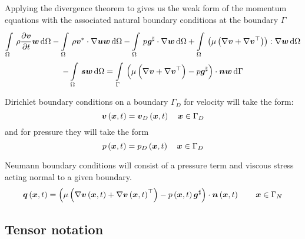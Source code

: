 Applying the divergence theorem to 
gives us the weak form of the momentum equations with the associated natural
boundary conditions at the boundary $\Gamma$ \ie
\begin{multline}
  \gint{\Omega}{}{\rho\delby{\vectr{v}}{t}{\vectr{w}}}{\Omega}
  -\gint{\Omega}{}{\dotprod{\rho\vectr{v}^{*}}{\gradient{}{\vectr{u}}}\vectr{w}}{\Omega}
  -\gint{\Omega}{}{\dotprod{p\sharptensor{\tensor{g}}}{\gradient{}{\vectr{w}}}}{\Omega}
  +\gint{\Omega}{}{\doubledotprod{\pbrac{\mu\pbrac{\gradient{}{\vectr{v}}
          +\gradient{}{\transpose{\vectr{v}}}}}}{\gradient{}{\vectr{w}}}}{\Omega} \\
  -\gint{\Omega}{}{\vectr{s}\vectr{w}}{\Omega}
  =\gint{\Gamma}{}{\dotprod{\pbrac{\mu\pbrac{\gradient{}{\vectr{v}}+\transpose{\gradient{}{\vectr{v}}}}-
        p\sharptensor{\vectr{g}}}}{\vectr{n}}\vectr{w}}{\Gamma}
  \label{eqn:GalerkinStokesGenMomentum}
\end{multline}

Dirichlet boundary conditions on a boundary
$\Gamma_D$ for velocity will take the form:
\begin{equation}
  \fnof{\vectr{v}}{\vectr{x},t} = \fnof{\vectr{v}_{D}}{\vectr{x},t} \quad \vectr{x}\in\Gamma_{D}\\
  \label{eqn:StokesVelocityDirichletBC} 
\end{equation}
and for pressure they will take the form
\begin{equation}
  \fnof{p}{\vectr{x},t} = \fnof{p_{D}}{\vectr{x},t} \quad \vectr{x}\in\Gamma_{D}\\
  \label{eqn:StokesPressureDirichletBC} 
\end{equation}

Neumann boundary conditions will consist of a pressure term and
viscous stress acting normal to a given boundary.
\begin{equation}
  \fnof{\vectr{q}}{\vectr{x},t} =
  \dotprod{\pbrac{\mu\pbrac{\gradient{}{\fnof{\vectr{v}}{\vectr{x},t}}+\transpose{\gradient{}{\fnof{\vectr{v}}{\vectr{x},t}}}}-
      \fnof{p}{\vectr{x},t}\sharptensor{\vectr{g}}}}{\fnof{\vectr{n}}{\vectr{x},t}}  \quad\quad \vectr{x}\in\Gamma_{N}
  \label{eqn:StokesNeumannBC}  
\end{equation}

\subsection{Tensor notation}

